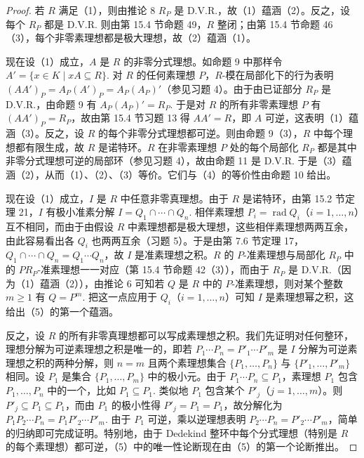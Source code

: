 \begin{proof}
若 \(R\) 满足（1），则由推论 8 \(R_P\) 是 D.V.R.，故（1）蕴涵（2）。反之，设每个 \(R_P\) 都是 D.V.R. 则由第 15.4 节命题 49，\(R\) 整闭；由第 15.4 节命题 46（3），每个非零素理想都是极大理想，故（2）蕴涵（1）。

现在设（1）成立，\(A\) 是 \(R\) 的非零分式理想。如命题 9 中那样令 \(A' = \{x \in K \mid xA \subseteq R\}\). 对 \(R\) 的任何素理想 \(P\)，\(R\)-模在局部化下的行为表明 \((AA')_P = A_P(A')_P = A_P(A_P)'\)（参见习题 4）。由于由已证部分 \(R_P\) 是 D.V.R.，由命题 9 有 \(A_P(A_P)' = R_P\). 于是对 \(R\) 的所有非零素理想 \(P\) 有 \((AA')_P = R_P\)，故由第 15.4 节习题 13 得 \(AA' = R\)，即 \(A\) 可逆，这表明（1）蕴涵（3）。反之，设 \(R\) 的每个非零分式理想都可逆。则由命题 9（3），\(R\) 中每个理想都有限生成，故 \(R\) 是诺特环。\(R\) 在非零素理想 \(P\) 处的每个局部化 \(R_P\) 都是其中非零分式理想可逆的局部环（参见习题 4），故由命题 11 是 D.V.R. 于是（3）蕴涵（2），从而（1）、（2）、（3）等价。它们与（4）的等价性由命题 10 给出。

现在设（1）成立，\(I\) 是 \(R\) 中任意非零真理想。由于 \(R\) 是诺特环，由第 15.2 节定理 21，\(I\) 有极小准素分解 \(I = Q_1 \cap \cdots \cap Q_n\). 相伴素理想 \(P_i = \operatorname{rad}Q_i\)（\(i = 1, \ldots, n\)）互不相同，而由于由假设 \(R\) 中素理想都是极大理想，这些相伴素理想两两互余，由此容易看出各 \(Q_i\) 也两两互余（习题 5）。于是由第 7.6 节定理 17，\(Q_1 \cap \cdots \cap Q_n = Q_1\cdots Q_n\)，故 \(I\) 是准素理想之积。\(R\) 的 \(P\)-准素理想与局部化 \(R_P\) 中的 \(PR_P\)-准素理想一一对应（第 15.4 节命题 42（3）），而由于 \(R_P\) 是 D.V.R.（因为（1）蕴涵（2）），由推论 6 可知若 \(Q\) 是 \(R\) 中的 \(P\)-准素理想，则对某个整数 \(m \geq 1\) 有 \(Q = P^m\). 把这一点应用于 \(Q_i\)（\(i = 1, \ldots, n\)）可知 \(I\) 是素理想幂之积，这给出（5）的第一个蕴涵。

反之，设 \(R\) 的所有非零真理想都可以写成素理想之积。我们先证明对任何整环，理想分解为可逆素理想之积是唯一的，即若 \(P_1\cdots P_n = P'_1\cdots P'_m\) 是 \(I\) 分解为可逆素理想之积的两种分解，则 \(n = m\) 且两个素理想集合 \(\{P_1, \ldots, P_n\}\) 与 \(\{P'_1, \ldots, P'_m\}\) 相同。设 \(P_1\) 是集合 \(\{P_1, \ldots, P_m\}\) 中的极小元。由于 \(P_1\cdots P_n \subseteq P_1\)，素理想 \(P_1\) 包含 \(P_1, \ldots, P_n\) 中的一个，比如 \(P_1 \subseteq P_1\). 类似地 \(P_1\) 包含某个 \(P'_j\)（\(j = 1, \ldots, m\)）。则 \(P'_j \subseteq P_1 \subseteq P_1\)，而由 \(P_1\) 的极小性得 \(P'_j = P_1 = P_1\)，故分解化为 \(P_1P_2\cdots P_n = P_1P'_2\cdots P'_m\). 由于 \(P_1\) 可逆，乘以逆理想表明 \(P_2\cdots P_n = P'_2\cdots P'_m\)，简单的归纳即可完成证明。特别地，由于 Dedekind 整环中每个分式理想（特别是 \(R\) 的每个素理想）都可逆，（5）中的唯一性论断现在由（5）的第一个论断推出。


\end{proof}
